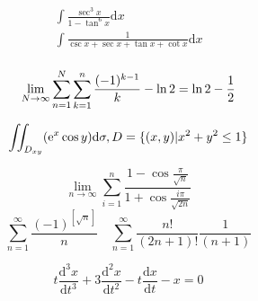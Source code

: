 \documentclass{article}
\begin{document}
\begin{align*}
    \int\frac{\sec^3 x}{1-\tan^6 x}\mathrm{d}x \\
    \int\frac{1}{\csc x+\sec x+\tan x +\cot x}\mathrm{d}x \\ 
\end{align*}

\clearpage
\begin{displaymath}
    \lim_{N \to \infty}\sum_{n=1}^N\sum_{k=1}^n\frac{(-1)^{k-1}}{k}-\ln 2  = \ln 2-\frac{1}{2} \newline 
\end{displaymath}

\begin{displaymath}
    \iint_{D_{xy}}(\mathrm{e}^{x}\cos y)\mathrm{d}\sigma, D=\{(x,y)|x^2+y^2 \le 1\} \\  
\end{displaymath}

\begin{displaymath}
    \lim_{n \to \infty}\sum_{i=1}^{n}\frac{1-\cos\frac{\pi}{\sqrt{n}}}{1+\cos\frac{i\pi}{\sqrt{2n}}}
\end{displaymath}
\begin{displaymath}
    \sum_{n=1 }^\infty \frac{(-1)^{[\sqrt{n}]}}{n} \quad 
    \sum_{n=1}^{\infty} \frac{n!}{(2n+1)!}\frac{1}{(n+1)} 
\end{displaymath}

\begin{displaymath}
    t\frac{\mathrm{d}^3x}{\mathrm{d}t^3} + 3\frac{\mathrm{d}^2x}{\mathrm{d}t^2}-t\frac{\mathrm{d}x}{\mathrm{d}t}-x = 0
\end{displaymath}
\end{document}
